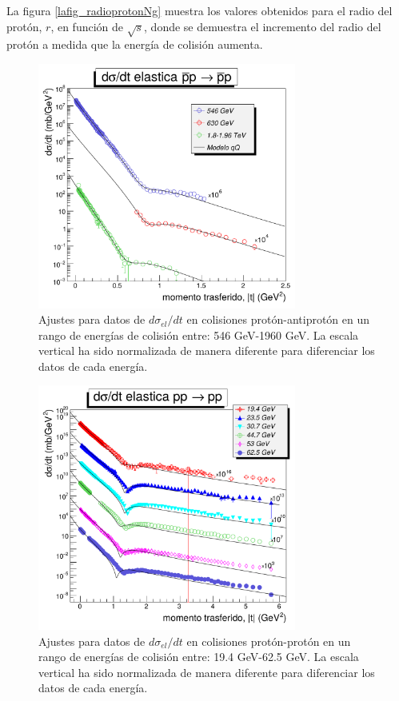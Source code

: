 La figura \ref{lafig_radioprotonNg} muestra los valores obtenidos  para el radio del protón, $r$, en función de $\sqrt{s}$, donde se demuestra el incremento del radio del protón a medida que la energía de colisión aumenta.%
\begin{figure}[H]\centering
\includegraphics[width=8.5cm]{graficas/unnamedpbarp.pdf}
\caption{\mismall Ajustes para datos de $d\sigma_{el}/dt$ en colisiones prot\'on-antiprot\'on en un rango de energías de colisión entre: 546 GeV-1960 GeV. La escala vertical ha sido normalizada de manera diferente para diferenciar los datos de cada energía.}
\label{lafig_2}
\end{figure}\vskip -0.5cm
\begin{figure}[H]\centering
\includegraphics[width=8.5cm]{graficas/multifitgraf.pdf}
\caption{\mismall Ajustes para datos de $d\sigma_{el}/dt$ en colisiones prot\'on-prot\'on en un rango de energías de colisión entre: 19.4 GeV-62.5 GeV. La escala vertical ha sido normalizada de manera diferente para diferenciar los datos de cada energía.}
\label{lafig_3}
\end{figure}%
